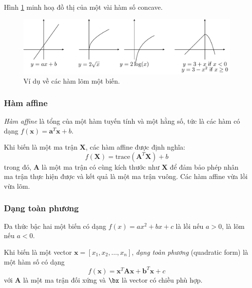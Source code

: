 Hình \ref{fig:16_concavefunctions} minh hoạ đồ thị của một vài hàm số concave.

\begin{figure}[t]
\centering
    \includegraphics[width = \textwidth]{Chapters/08_ConvexOptimization/16_convexity/latex/concavefunctions.pdf}
    \caption[]{Ví dụ về các hàm lõm một biến.}
    \label{fig:16_concavefunctions}
    \captionsetup[figure]{format=rule, justification=centering}
\end{figure}
 
\subsubsection{Hàm affine}
\textit{Hàm affine} là tổng của một hàm tuyến tính và một hằng số, tức là các hàm có dạng $f(\mathbf{x}) = \mathbf{a}^T\mathbf{x} + b $. 
 
Khi biến là một ma trận $\mathbf{X}$, các hàm affine được định nghĩa: 
\begin{equation*} 
f(\mathbf{X}) = \text{trace}(\mathbf{A}^T\mathbf{X}) + b 
\end{equation*} 
trong đó, $\mathbf{A}$ là một ma trận có cùng kích thước như $\mathbf{X}$
để đảm bảo phép nhân ma trận thực hiện được và kết quả là một ma trận vuông.
Các hàm affine vừa lồi vừa lõm. 

\subsubsection{Dạng toàn phương}
Đa thức bậc hai một biến có dạng $f(x) = a x^2 + bx + c$ là lồi nếu $a > 0$, là lõm nếu $a < 0$. 
 
Khi biến là một vector $\mathbf{x} = [x_1, x_2, \dots, x_n]$, \textit{dạng
toàn phương} ({quadratic form}) là một hàm số có dạng
\begin{equation*} 
f(\mathbf{x}) = \mathbf{x}^T\mathbf{A}\mathbf{x} + \mathbf{b}^T\mathbf{x} + c 
\end{equation*} 
với $\mathbf{A}$ là một ma trận đối xứng và $\bx$ là vector có chiều phù hợp. 


